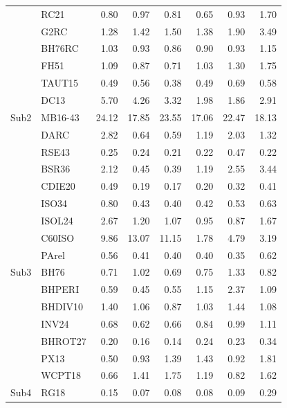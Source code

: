\begin{longtable}{ll:d{2.2}d{2.2}d{2.2}:d{2.2}d{2.2}d{2.2}}
          & RC21      & 0.80  & 0.97  & 0.81  & 0.65   & 0.93  & 1.70  \\
          & G2RC      & 1.28  & 1.42  & 1.50  & 1.38   & 1.90  & 3.49  \\
          & BH76RC    & 1.03  & 0.93  & 0.86  & 0.90   & 0.93  & 1.15  \\
          & FH51      & 1.09  & 0.87  & 0.71  & 1.03   & 1.30  & 1.75  \\
          & TAUT15    & 0.49  & 0.56  & 0.38  & 0.49   & 0.69  & 0.58  \\
          & DC13      & 5.70  & 4.26  & 3.32  & 1.98   & 1.86  & 2.91  \\ \hdashline
  Sub2    & MB16-43   & 24.12 & 17.85 & 23.55 & 17.06  & 22.47 & 18.13 \\
          & DARC      & 2.82  & 0.64  & 0.59  & 1.19   & 2.03  & 1.32  \\
          & RSE43     & 0.25  & 0.24  & 0.21  & 0.22   & 0.47  & 0.22  \\
          & BSR36     & 2.12  & 0.45  & 0.39  & 1.19   & 2.55  & 3.44  \\
          & CDIE20    & 0.49  & 0.19  & 0.17  & 0.20   & 0.32  & 0.41  \\
          & ISO34     & 0.80  & 0.43  & 0.40  & 0.42   & 0.53  & 0.63  \\
          & ISOL24    & 2.67  & 1.20  & 1.07  & 0.95   & 0.87  & 1.67  \\
          & C60ISO    & 9.86  & 13.07 & 11.15 & 1.78   & 4.79  & 3.19  \\
          & PArel     & 0.56  & 0.41  & 0.40  & 0.40   & 0.35  & 0.62  \\ \hdashline
  Sub3    & BH76      & 0.71  & 1.02  & 0.69  & 0.75   & 1.33  & 0.82  \\
          & BHPERI    & 0.59  & 0.45  & 0.55  & 1.15   & 2.37  & 1.09  \\
          & BHDIV10   & 1.40  & 1.06  & 0.87  & 1.03   & 1.44  & 1.08  \\
          & INV24     & 0.68  & 0.62  & 0.66  & 0.84   & 0.99  & 1.11  \\
          & BHROT27   & 0.20  & 0.16  & 0.14  & 0.24   & 0.23  & 0.34  \\
          & PX13      & 0.50  & 0.93  & 1.39  & 1.43   & 0.92  & 1.81  \\
          & WCPT18    & 0.66  & 1.41  & 1.75  & 1.19   & 0.82  & 1.62  \\ \hdashline
  Sub4    & RG18      & 0.15  & 0.07  & 0.08  & 0.08   & 0.09  & 0.29  \\

\end{longtable}
